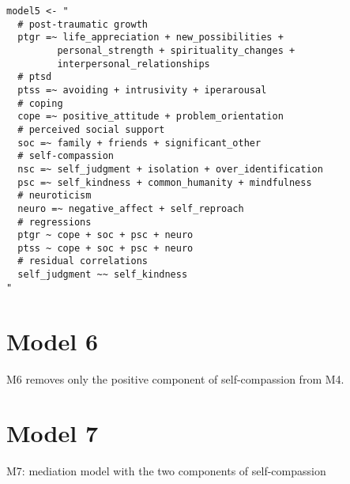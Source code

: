 \documentclass[aps,floatfix,prl]{revtex4}
\begin{document}
\begin{verbatim}
model5 <- "
  # post-traumatic growth
  ptgr =~ life_appreciation + new_possibilities + 
         personal_strength + spirituality_changes + 
         interpersonal_relationships
  # ptsd
  ptss =~ avoiding + intrusivity + iperarousal
  # coping
  cope =~ positive_attitude + problem_orientation 
  # perceived social support
  soc =~ family + friends + significant_other
  # self-compassion
  nsc =~ self_judgment + isolation + over_identification
  psc =~ self_kindness + common_humanity + mindfulness
  # neuroticism
  neuro =~ negative_affect + self_reproach
  # regressions
  ptgr ~ cope + soc + psc + neuro
  ptss ~ cope + soc + psc + neuro
  # residual correlations
  self_judgment ~~ self_kindness
"
\end{verbatim}

\newpage

\hypertarget{model-6}{%
\section{Model 6}\label{model-6}}

M6 removes only the positive component of self-compassion from M4.

\newpage

\hypertarget{model-7}{%
\section{Model 7}\label{model-7}}

M7: mediation model with the two components of self-compassion
\end{document}
